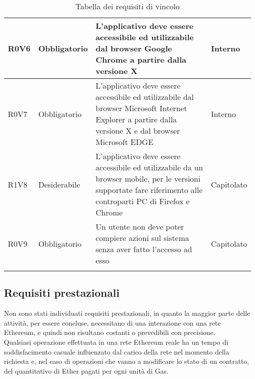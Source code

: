 \documentclass[AnalisiDeiRequisiti.tex]{subfiles}
\begin{document}
\begin{longtable}[H]{|p{2.5cm}|p{2.5cm}|p{5cm}|p{2cm}|}
	R0V6 & Obbligatorio & L'applicativo deve essere accessibile ed utilizzabile dal browser Google Chrome a partire dalla versione X & Interno \\ \hline %
	R0V7 & Obbligatorio & L'applicativo deve essere accessibile ed utilizzabile dal browser Microsoft Internet Explorer a partire dalla versione X e dal browser Microsoft EDGE & Interno \\ \hline %
	R1V8 & Desiderabile & L'applicativo deve essere accessibile ed utilizzabile da un browser mobile, per le versioni supportate fare riferimento alle controparti PC di Firefox e Chrome & Capitolato \\ \hline %
	R0V9 & Obbligatorio & Un utente non deve poter compiere azioni sul sistema senza aver fatto l'accesso ad esso & Capitolato \\ \hline
	\caption{Tabella dei requisiti di vincolo}
\end{longtable}

\subsection{Requisiti prestazionali}

Non sono stati individuati requisiti prestazionali, in quanto la maggior parte delle attività, per essere concluse, necessitano di una interazione con una rete Ethereum, e quindi non risultano costanti o prevedibili con precisione.\\
Qualsiasi operazione effettuata in una rete Ethereum reale ha un tempo di soddisfacimento casuale influenzato dal carico della rete nel momento della richiesta e, nel caso di operazioni che vanno a modificare lo stato di un contratto, del quantitativo di Ether pagati per ogni unità di Gas.\\
 
\begin{comment}
\label{table:Tabella requisiti prestazionali}
\begin{longtable}[H]{|p{2.5cm}|p{2.5cm}|p{5cm}|p{2cm}|}
	\hline
	\rowcolor[HTML]{38FFF8} 
	\textbf{Identificatore} & \textbf{Importanza} & \textbf{Descrizione} & \textbf{Fonti} \\ \hline
	\endhead
	&  &  &  \\ \hline
	&  &  &  \\ \hline
	&  &  &  \\ \hline
	&  &  &  \\ \hline
	&  &  &  \\ \hline
	\caption{Tabella dei requisiti prestazionali}
\end{longtable}
\end{comment}
\end{document}
